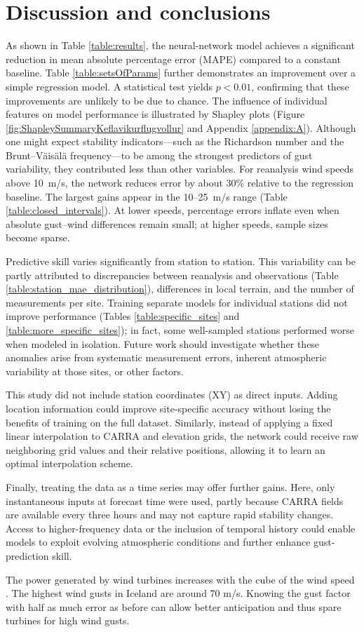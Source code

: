 \chapter{Discussion and conclusions}
\label{Chapter5}
As shown in Table \ref{table:results}, the neural-network model achieves a significant reduction in mean absolute percentage error (MAPE) compared to a constant baseline. Table \ref{table:setsOfParams} further demonstrates an improvement over a simple regression model. A statistical test yields $p<0.01$, confirming that these improvements are unlikely to be due to chance. The influence of individual features on model performance is illustrated by Shapley plots (Figure \ref{fig:ShapleySummaryKeflavikurflugvollur} and Appendix \ref{appendix:A}). Although one might expect stability indicators—such as the Richardson number and the Brunt--Väisälä frequency—to be among the strongest predictors of gust variability, they contributed less than other variables. For reanalysis wind speeds above 10~m/s, the network reduces error by about 30\% relative to the regression baseline. The largest gains appear in the 10--25~m/s range (Table \ref{table:closed_intervals}). At lower speeds, percentage errors inflate even when absolute gust--wind differences remain small; at higher speeds, sample sizes become sparse.

Predictive skill varies significantly from station to station. This variability can be partly attributed to discrepancies between reanalysis and observations (Table \ref{table:station_mae_distribution}), differences in local terrain, and the number of measurements per site. Training separate models for individual stations did not improve performance (Tables \ref{table:specific_sites} and \ref{table:more_specific_sites}); in fact, some well-sampled stations performed worse when modeled in isolation. Future work should investigate whether these anomalies arise from systematic measurement errors, inherent atmospheric variability at those sites, or other factors.

This study did not include station coordinates (XY) as direct inputs. Adding location information could improve site-specific accuracy without losing the benefits of training on the full dataset. Similarly, instead of applying a fixed linear interpolation to CARRA and elevation grids, the network could receive raw neighboring grid values and their relative positions, allowing it to learn an optimal interpolation scheme.

Finally, treating the data as a time series may offer further gains. Here, only instantaneous inputs at forecast time were used, partly because CARRA fields are available every three hours and may not capture rapid stability changes. Access to higher-frequency data or the inclusion of temporal history could enable models to exploit evolving atmospheric conditions and further enhance gust-prediction skill.

The power generated by wind turbines increases with the cube of the wind speed \cite{wind_power}. The highest wind gusts in Iceland are around 70 m/s. Knowing the gust factor with half as much error as before can allow better anticipation and thus spare turbines for high wind gusts. 